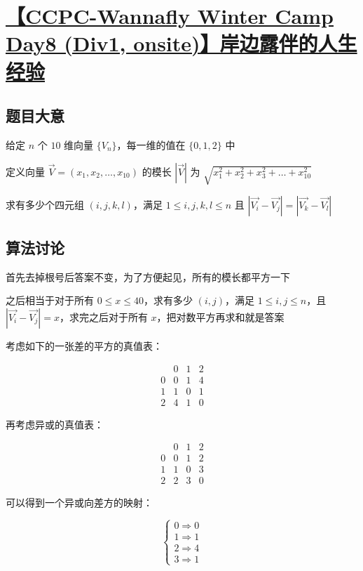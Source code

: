\documentclass[UTF8]{article}
\begin{document}
\section{\href{https://www.zhixincode.com/contest/28/problem/I?problem_id=412}{【CCPC-Wannafly Winter Camp Day8 (Div1, onsite)】岸边露伴的人生经验}}

\subsection{题目大意}

给定 $n$ 个 $10$ 维向量 $\{V_n\}$，每一维的值在 $\{0,1,2\}$ 中

定义向量 $\overrightarrow{V}=(x_1,x_2, \dots ,x_10)$ 的模长 $|\overrightarrow{V}|$ 为 $\sqrt{x_1^2+x_2^2+x_3^2+\dots+x_{10}^2}$

求有多少个四元组 $(i,j,k,l)$，满足 $1 \le i,j,k,l \le n$ 且 $|\overrightarrow{V_i}-\overrightarrow{V_j}|=|\overrightarrow{V_k}-\overrightarrow{V_l}|$

\subsection{算法讨论}

首先去掉根号后答案不变，为了方便起见，所有的模长都平方一下

之后相当于对于所有 $0 \le x \le 40$，求有多少 $(i,j)$，满足 $1 \le i,j \le n$，且 $|\overrightarrow{V_i}-\overrightarrow{V_j}|=x$，求完之后对于所有 $x$，把对数平方再求和就是答案

考虑如下的一张差的平方的真值表：

$$
\begin{array} {c|lcr}
 & \text{0} & \text{1} & \text{2} \\
\hline
0 & 0 & 1 & 4 \\
1 & 1 & 0 & 1 \\
2 & 4 & 1 & 0
\end{array}
$$

再考虑异或的真值表：

$$
\begin{array} {c|lcr}
 & \text{0} & \text{1} & \text{2} \\
\hline
0 & 0 & 1 & 2 \\
1 & 1 & 0 & 3 \\
2 & 2 & 3 & 0
\end{array}
$$

可以得到一个异或向差方的映射：

$$
\begin{cases}
0 \Rightarrow 0 \\
1 \Rightarrow 1 \\
2 \Rightarrow 4 \\
3 \Rightarrow 1
\end{cases}
$$
\end{document}
